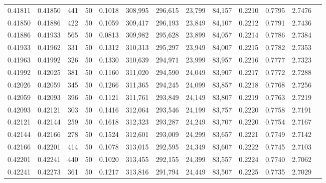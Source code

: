\begin{tabular}{rrrrrrrrrrrrr}
0.41811 & 0.41850 &   441 &  50 &                                     0.1018 & 308,995 & 296,615 &  23,799 &  84,157 & 0.2210 & 0.7795 & 2.7476 \\
0.41850 & 0.41886 &   422 &  50 &                                     0.1059 & 309,417 & 296,193 &  23,849 &  84,107 & 0.2212 & 0.7791 & 2.7436 \\
0.41886 & 0.41933 &   565 &  50 &                                     0.0813 & 309,982 & 295,628 &  23,899 &  84,057 & 0.2214 & 0.7786 & 2.7384 \\
0.41933 & 0.41962 &   331 &  50 &                                     0.1312 & 310,313 & 295,297 &  23,949 &  84,007 & 0.2215 & 0.7782 & 2.7353 \\
0.41963 & 0.41992 &   326 &  50 &                                     0.1330 & 310,639 & 294,971 &  23,999 &  83,957 & 0.2216 & 0.7777 & 2.7323 \\
0.41992 & 0.42025 &   381 &  50 &                                     0.1160 & 311,020 & 294,590 &  24,049 &  83,907 & 0.2217 & 0.7772 & 2.7288 \\
0.42026 & 0.42059 &   345 &  50 &                                     0.1266 & 311,365 & 294,245 &  24,099 &  83,857 & 0.2218 & 0.7768 & 2.7256 \\
0.42059 & 0.42093 &   396 &  50 &                                     0.1121 & 311,761 & 293,849 &  24,149 &  83,807 & 0.2219 & 0.7763 & 2.7219 \\
0.42093 & 0.42121 &   303 &  50 &                                     0.1416 & 312,064 & 293,546 &  24,199 &  83,757 & 0.2220 & 0.7758 & 2.7191 \\
0.42121 & 0.42144 &   259 &  50 &                                     0.1618 & 312,323 & 293,287 &  24,249 &  83,707 & 0.2220 & 0.7754 & 2.7167 \\
0.42144 & 0.42166 &   278 &  50 &                                     0.1524 & 312,601 & 293,009 &  24,299 &  83,657 & 0.2221 & 0.7749 & 2.7142 \\
0.42166 & 0.42201 &   414 &  50 &                                     0.1078 & 313,015 & 292,595 &  24,349 &  83,607 & 0.2222 & 0.7745 & 2.7103 \\
0.42201 & 0.42241 &   440 &  50 &                                     0.1020 & 313,455 & 292,155 &  24,399 &  83,557 & 0.2224 & 0.7740 & 2.7062 \\
0.42241 & 0.42273 &   361 &  50 &                                     0.1217 & 313,816 & 291,794 &  24,449 &  83,507 & 0.2225 & 0.7735 & 2.7029 \\

\end{tabular}
